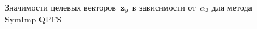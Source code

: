\begin{figure}[ht]
	\begin{minipage}{.5\linewidth}
	\end{minipage}%
	\begin{minipage}{.5\linewidth}
	\end{minipage}\par\medskip
	
	\caption{Значимости целевых векторов~$\mathbf{z}_y$ в зависимости от~$\alpha_3$ для метода SymImp QPFS}
	\label{ch3:fig:features_vs_alpha_ecog}
\end{figure}

